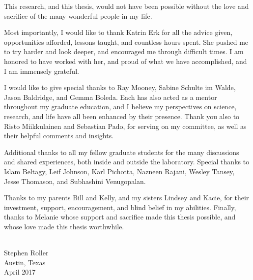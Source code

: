 This research, and this thesis, would not have been possible without the
love and sacrifice of the many wonderful people in my life.

Most importantly, I would like to thank Katrin Erk for all the advice given,
opportunities afforded, lessons taught, and countless hours spent. She pushed
me to try harder and look deeper, and encouraged me through difficult times.
I am honored to have worked with her, and proud of what we have accomplished,
and I am immensely grateful.

I would like to give special thanks to Ray Mooney, Sabine Schulte im Walde,
Jason Baldridge, and Gemma Boleda. Each has also acted as a mentor throughout
my graduate education, and I believe my perspectives on science, research, and
life have all been enhanced by their presence. Thank you also to
Risto Miikkulainen and Sebastian Pado, for serving on my committee, as well
as their helpful comments and insights.

Additional thanks to all my fellow graduate students for the many discussions
and shared experiences, both inside and outside the laboratory. Special thanks
to Islam Beltagy, Leif Johnson, Karl Pichotta, Nazneen Rajani,
Wesley Tansey, Jesse Thomason, and Subhashini Venugopalan.

Thanks to my parents Bill and Kelly, and my sisters Lindsey and Kacie, for
their investment, support, encouragement, and blind belief in my abilities.
Finally, thanks to Melanie whose support and sacrifice made this
thesis possible, and whose love made this thesis worthwhile.

\begin{flushright}
~\\
Stephen Roller\\
Austin, Texas\\
April 2017
\end{flushright}
